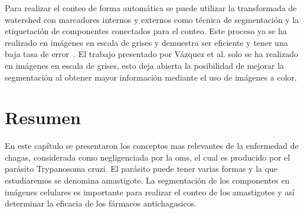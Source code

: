 Para realizar el conteo de forma automática se puede utilizar la transformada de watershed con marcadores internos y externos como técnica de segmentación y la etiquetación de componentes conectados para el conteo. Este proceso ya se ha realizado en imágenes en escala de grises y demuestra ser eficiente y tener una baja tasa de error~\cite{noguera2013mathematical}. El trabajo presentado por Vázquez et al. solo se ha realizado en imágenes en escala de grises, esto deja abierta la posibilidad de mejorar la segmentación al obtener mayor información mediante el uso de imágenes a color.

\section{Resumen}

En este capítulo se presentaron los conceptos mas relevantes de la enfermedad de chagas, considerada como negligenciada por la \gls{oms}, el cual es producido por el parásito Trypanosoma cruzi. El parásito puede tener varias formas y la que estudiaremos se denomina amastigote. La segmentación de los componentes en imágenes celulares es importante para realizar el conteo de los amastigotes y así determinar la eficacia de los fármacos antichagasicos.